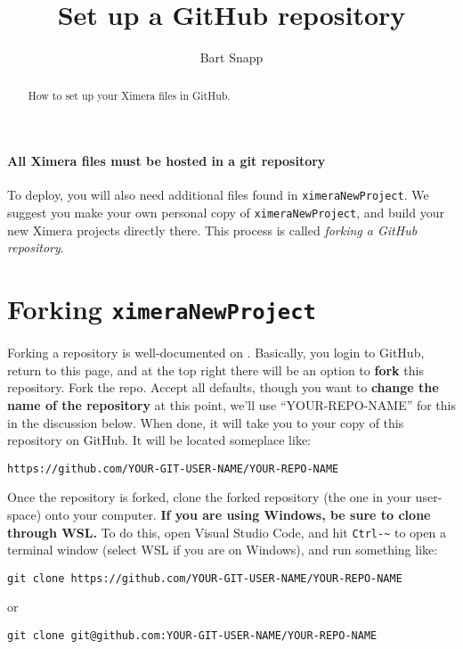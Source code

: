 \documentclass{ximera}
\title{Set up a GitHub repository}
\author{Bart Snapp}
\begin{document}
\begin{abstract}
  How to set up your Ximera files in GitHub.
\end{abstract}
\maketitle


\paragraph{All Ximera files must be hosted in a git repository} To deploy, you
will also need	additional
files found in \verb!ximeraNewProject!. We suggest you make your own personal copy of  \verb!ximeraNewProject!, and build your new Ximera projects directly there.
This process is called \textit{forking a GitHub repository}.



\section{Forking \texttt{ximeraNewProject}}

Forking a repository is well-documented on
.
Basically, you login to GitHub, return to this page, and at the top right there
will be an option to \textbf{fork} this repository. Fork the repo. Accept all
defaults, though you want to \textbf{change the name of the repository} at this
point, we'll use ``YOUR-REPO-NAME'' for this in the discussion below. When done, it will take you to
your copy of this repository on GitHub. It will be located someplace like:
\begin{center}
  \texttt{https://github.com/YOUR-GIT-USER-NAME/YOUR-REPO-NAME}
\end{center}
Once the repository is forked, clone the forked repository (the one in your
user-space) onto your computer. \textbf{If you are using Windows, be sure to
  clone through WSL.} To do this, open Visual Studio Code, and hit \verb!Ctrl-~! to open a terminal window (select WSL if you are on Windows), and run something like:
\begin{verbatim}
git clone https://github.com/YOUR-GIT-USER-NAME/YOUR-REPO-NAME
\end{verbatim}
or
\begin{verbatim}
git clone git@github.com:YOUR-GIT-USER-NAME/YOUR-REPO-NAME
\end{verbatim}
\end{document}
